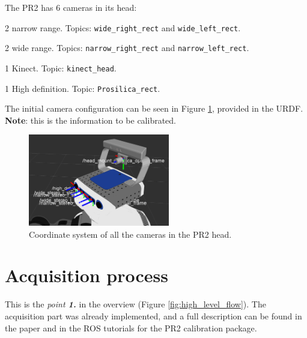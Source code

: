 The PR2 has 6 cameras in its head:
\begin{itemize*}
 \item 2 narrow range. Topics: \texttt{wide\_right\_rect} and \texttt{wide\_left\_rect}.
 \item 2 wide range. Topics: \texttt{narrow\_right\_rect} and \texttt{narrow\_left\_rect}.
 \item 1 Kinect. Topic: \texttt{kinect\_head}.
 \item 1 High definition. Topic: \texttt{Prosilica\_rect}.
\end{itemize*}

\noindent
The initial camera configuration can be seen in Figure \ref{fig:pr2_cameras}, provided in the URDF. \textbf{Note}: this is the information to be calibrated.
\begin{figure}[!htbp]
 \centering
 \includegraphics[width=0.55\textwidth]{images/screenshots/PR2_cameras.png}
 \caption{Coordinate system of all the cameras in the PR2 head.}
 \label{fig:pr2_cameras}
\end{figure}






\section{Acquisition process}
\label{sec:acquisition}

This is the \textit{point \textbf{1.}} in the overview (Figure \ref{fig:high_level_flow}). The acquisition part was already implemented, and a full description can be found in the paper  \cite{pr2_calibration_paper} and in the ROS tutorials for the PR2 calibration package.

%


